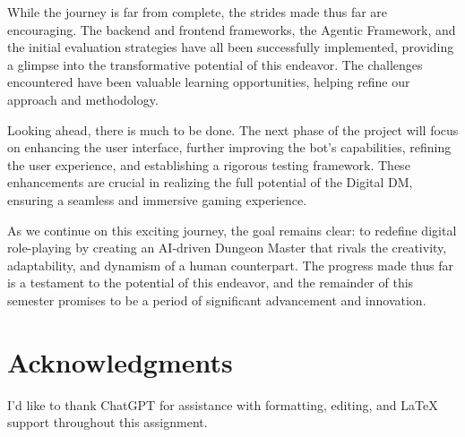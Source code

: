 \documentclass[letterpaper]{article}
\begin{document}
While the journey is far from complete, the strides made thus far are encouraging. The backend and frontend frameworks, the Agentic Framework, and the initial evaluation strategies have all been successfully implemented, providing a glimpse into the transformative potential of this endeavor. The challenges encountered have been valuable learning opportunities, helping refine our approach and methodology.

Looking ahead, there is much to be done. The next phase of the project will focus on enhancing the user interface, further improving the bot's capabilities, refining the user experience, and establishing a rigorous testing framework. These enhancements are crucial in realizing the full potential of the Digital DM, ensuring a seamless and immersive gaming experience.

As we continue on this exciting journey, the goal remains clear: to redefine digital role-playing by creating an AI-driven Dungeon Master that rivals the creativity, adaptability, and dynamism of a human counterpart. The progress made thus far is a testament to the potential of this endeavor, and the remainder of this semester promises to be a period of significant advancement and innovation.

\section*{Acknowledgments}
I'd like to thank ChatGPT \cite{ChatGPT2023} for assistance with formatting, editing, and LaTeX support throughout this assignment.


\end{document}
